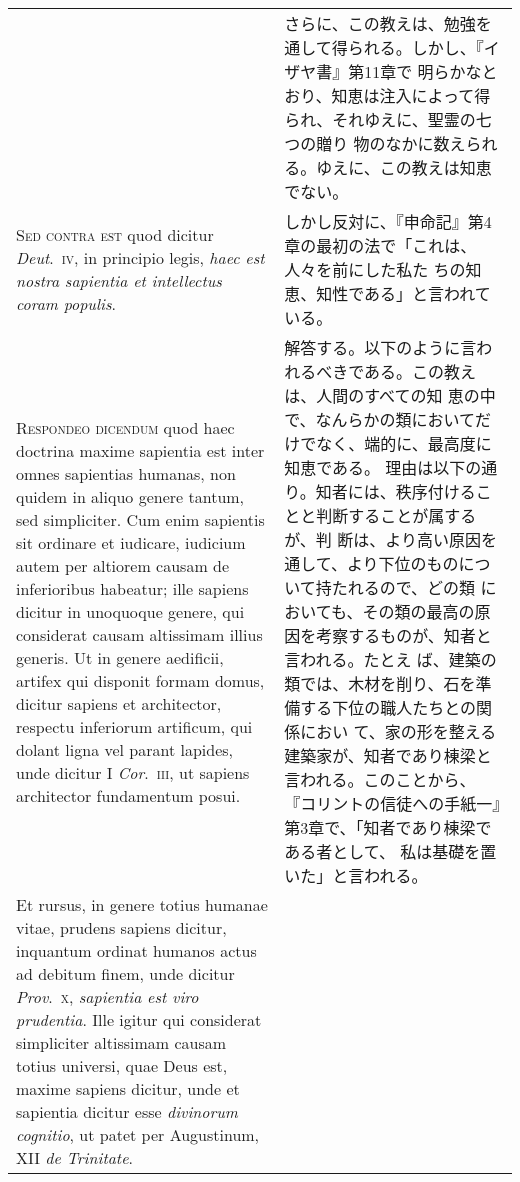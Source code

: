 \documentclass[10pt]{jsarticle}
\begin{document}
\begin{longtable}{p{21em}p{21em}}
&

さらに、この教えは、勉強を通して得られる。しかし、『イザヤ書』第11章で
明らかなとおり、知恵は注入によって得られ、それゆえに、聖霊の七つの贈り
物のなかに数えられる。ゆえに、この教えは知恵でない。


\\


{\scshape Sed contra est} quod dicitur {\itshape Deut}.~{\scshape iv},
in principio legis, {\itshape haec est nostra sapientia et intellectus
coram populis}.

&

しかし反対に、『申命記』第4章の最初の法で「これは、人々を前にした私た
ちの知恵、知性である」と言われている。

\\


{\scshape Respondeo dicendum} quod haec doctrina maxime sapientia est
inter omnes sapientias humanas, non quidem in aliquo genere tantum,
sed simpliciter. Cum enim sapientis sit ordinare et iudicare, iudicium
autem per altiorem causam de inferioribus habeatur; ille sapiens
dicitur in unoquoque genere, qui considerat causam altissimam illius
generis. Ut in genere aedificii, artifex qui disponit formam domus,
dicitur sapiens et architector, respectu inferiorum artificum, qui
dolant ligna vel parant lapides, unde dicitur I {\itshape
Cor}.~{\scshape iii}, ut sapiens architector fundamentum posui.


&


解答する。以下のように言われるべきである。この教えは、人間のすべての知
恵の中で、なんらかの類においてだけでなく、端的に、最高度に知恵である。
理由は以下の通り。知者には、秩序付けることと判断することが属するが、判
断は、より高い原因を通して、より下位のものについて持たれるので、どの類
においても、その類の最高の原因を考察するものが、知者と言われる。たとえ
ば、建築の類では、木材を削り、石を準備する下位の職人たちとの関係におい
て、家の形を整える建築家が、知者であり棟梁と言われる。このことから、
『コリントの信徒への手紙一』第3章で、「知者であり棟梁である者として、
私は基礎を置いた」と言われる。


\\


Et rursus, in genere totius humanae vitae, prudens sapiens dicitur,
inquantum ordinat humanos actus ad debitum finem, unde dicitur
{\itshape Prov}.~{\scshape x}, {\itshape sapientia est viro
prudentia}. Ille igitur qui considerat simpliciter altissimam causam
totius universi, quae Deus est, maxime sapiens dicitur, unde et
sapientia dicitur esse {\itshape divinorum cognitio}, ut patet per
Augustinum, XII {\itshape de Trinitate}.



\end{longtable}
\end{document}
